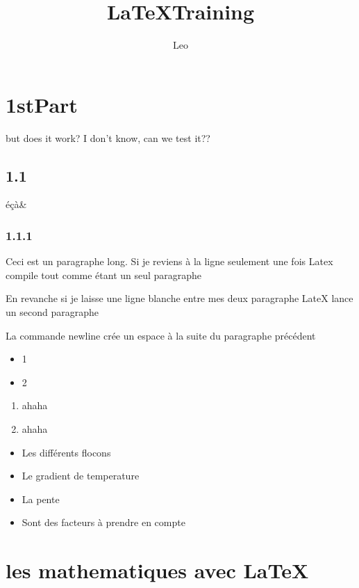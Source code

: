 \documentclass[a4paper, 10pt]{article}
\title{\LaTeX  Training}
\author{Leo}
\begin{document}
\maketitle
\tableofcontents
\newpage
\begin{multicols}{2}

\section{1stPart}
but does it work?
I don't know, can we test it?? 

\subsection{1.1}
éçà\& %
\subsubsection{1.1.1}


Ceci est un paragraphe long. 
Si je reviens à la  ligne seulement une fois Latex compile tout comme étant un seul paragraphe

En revanche si je laisse une ligne blanche entre mes deux paragraphe LateX lance un second paragraphe
\newline

La commande newline crée un espace à la suite du paragraphe précédent

\begin{itemize}
\item 1
\newline
\item 2 
\end{itemize}


\begin{enumerate}
\item ahaha
\item ahaha
\end{enumerate}

\begin{itemize}
	\item Les différents flocons
	\item Le gradient de temperature
	\item La pente
	\item Sont des facteurs à prendre en compte
\end{itemize}

\section{les mathematiques avec \LaTeX}


\end{multicols}
\end{document}
